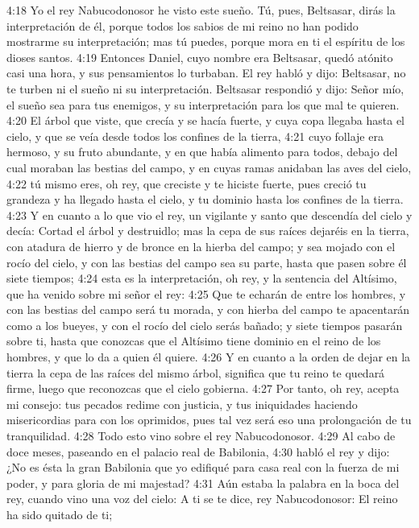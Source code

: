 4:18 Yo el rey Nabucodonosor he visto este sueño. Tú, pues, Beltsasar, dirás la interpretación de él, porque todos los sabios de mi reino no han podido mostrarme su interpretación; mas tú puedes, porque mora en ti el espíritu de los dioses santos. 
4:19 Entonces Daniel, cuyo nombre era Beltsasar, quedó atónito casi una hora, y sus pensamientos lo turbaban. El rey habló y dijo: Beltsasar, no te turben ni el sueño ni su interpretación. Beltsasar respondió y dijo: Señor mío, el sueño sea para tus enemigos, y su interpretación para los que mal te quieren. 
4:20 El árbol que viste, que crecía y se hacía fuerte, y cuya copa llegaba hasta el cielo, y que se veía desde todos los confines de la tierra, 
4:21 cuyo follaje era hermoso, y su fruto abundante, y en que había alimento para todos, debajo del cual moraban las bestias del campo, y en cuyas ramas anidaban las aves del cielo, 
4:22 tú mismo eres, oh rey, que creciste y te hiciste fuerte, pues creció tu grandeza y ha llegado hasta el cielo, y tu dominio hasta los confines de la tierra. 
4:23 Y en cuanto a lo que vio el rey, un vigilante y santo que descendía del cielo y decía: Cortad el árbol y destruidlo; mas la cepa de sus raíces dejaréis en la tierra, con atadura de hierro y de bronce en la hierba del campo; y sea mojado con el rocío del cielo, y con las bestias del campo sea su parte, hasta que pasen sobre él siete tiempos; 
4:24 esta es la interpretación, oh rey, y la sentencia del Altísimo, que ha venido sobre mi señor el rey: 
4:25 Que te echarán de entre los hombres, y con las bestias del campo será tu morada, y con hierba del campo te apacentarán como a los bueyes, y con el rocío del cielo serás bañado; y siete tiempos pasarán sobre ti, hasta que conozcas que el Altísimo tiene dominio en el reino de los hombres, y que lo da a quien él quiere. 
4:26 Y en cuanto a la orden de dejar en la tierra la cepa de las raíces del mismo árbol, significa que tu reino te quedará firme, luego que reconozcas que el cielo gobierna. 
4:27 Por tanto, oh rey, acepta mi consejo: tus pecados redime con justicia, y tus iniquidades haciendo misericordias para con los oprimidos, pues tal vez será eso una prolongación de tu tranquilidad. 
4:28 Todo esto vino sobre el rey Nabucodonosor. 
4:29 Al cabo de doce meses, paseando en el palacio real de Babilonia, 
4:30 habló el rey y dijo: ¿No es ésta la gran Babilonia que yo edifiqué para casa real con la fuerza de mi poder, y para gloria de mi majestad? 
4:31 Aún estaba la palabra en la boca del rey, cuando vino una voz del cielo: A ti se te dice, rey Nabucodonosor: El reino ha sido quitado de ti; 
